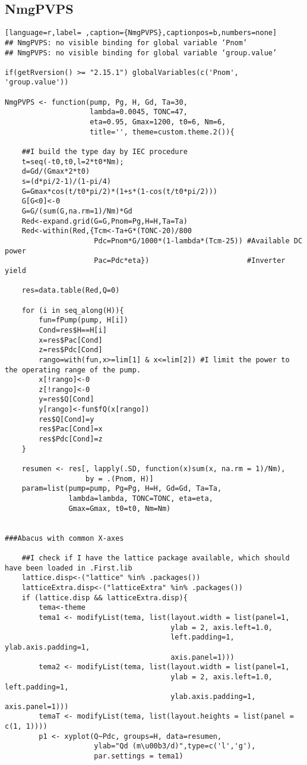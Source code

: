 \subsection{NmgPVPS}
\label{sec:orgfd55a8f}
\label{subsec:nmgpvps}
\begin{lstlisting}[language=r,label= ,caption={NmgPVPS},captionpos=b,numbers=none]
## NmgPVPS: no visible binding for global variable ‘Pnom’
## NmgPVPS: no visible binding for global variable ‘group.value’

if(getRversion() >= "2.15.1") globalVariables(c('Pnom', 'group.value'))

NmgPVPS <- function(pump, Pg, H, Gd, Ta=30,
                    lambda=0.0045, TONC=47,
                    eta=0.95, Gmax=1200, t0=6, Nm=6,
                    title='', theme=custom.theme.2()){

    ##I build the type day by IEC procedure
    t=seq(-t0,t0,l=2*t0*Nm);
    d=Gd/(Gmax*2*t0)
    s=(d*pi/2-1)/(1-pi/4)
    G=Gmax*cos(t/t0*pi/2)*(1+s*(1-cos(t/t0*pi/2)))
    G[G<0]<-0
    G=G/(sum(G,na.rm=1)/Nm)*Gd
    Red<-expand.grid(G=G,Pnom=Pg,H=H,Ta=Ta)
    Red<-within(Red,{Tcm<-Ta+G*(TONC-20)/800
                     Pdc=Pnom*G/1000*(1-lambda*(Tcm-25)) #Available DC power
                     Pac=Pdc*eta})                       #Inverter yield

    res=data.table(Red,Q=0)

    for (i in seq_along(H)){
        fun=fPump(pump, H[i])
        Cond=res$H==H[i]
        x=res$Pac[Cond]
        z=res$Pdc[Cond]
        rango=with(fun,x>=lim[1] & x<=lim[2]) #I limit the power to the operating range of the pump.
        x[!rango]<-0
        z[!rango]<-0
        y=res$Q[Cond]
        y[rango]<-fun$fQ(x[rango])
        res$Q[Cond]=y
        res$Pac[Cond]=x
        res$Pdc[Cond]=z
    }

    resumen <- res[, lapply(.SD, function(x)sum(x, na.rm = 1)/Nm),
                   by = .(Pnom, H)]
    param=list(pump=pump, Pg=Pg, H=H, Gd=Gd, Ta=Ta,
               lambda=lambda, TONC=TONC, eta=eta,
               Gmax=Gmax, t0=t0, Nm=Nm)


###Abacus with common X-axes

    ##I check if I have the lattice package available, which should have been loaded in .First.lib
    lattice.disp<-("lattice" %in% .packages())
    latticeExtra.disp<-("latticeExtra" %in% .packages())
    if (lattice.disp && latticeExtra.disp){
        tema<-theme
        tema1 <- modifyList(tema, list(layout.width = list(panel=1,
                                       ylab = 2, axis.left=1.0,
                                       left.padding=1, ylab.axis.padding=1,
                                       axis.panel=1)))
        tema2 <- modifyList(tema, list(layout.width = list(panel=1,
                                       ylab = 2, axis.left=1.0, left.padding=1,
                                       ylab.axis.padding=1, axis.panel=1)))
        temaT <- modifyList(tema, list(layout.heights = list(panel = c(1, 1))))
        p1 <- xyplot(Q~Pdc, groups=H, data=resumen,
                     ylab="Qd (m\u00b3/d)",type=c('l','g'),
                     par.settings = tema1)


\end{lstlisting}

